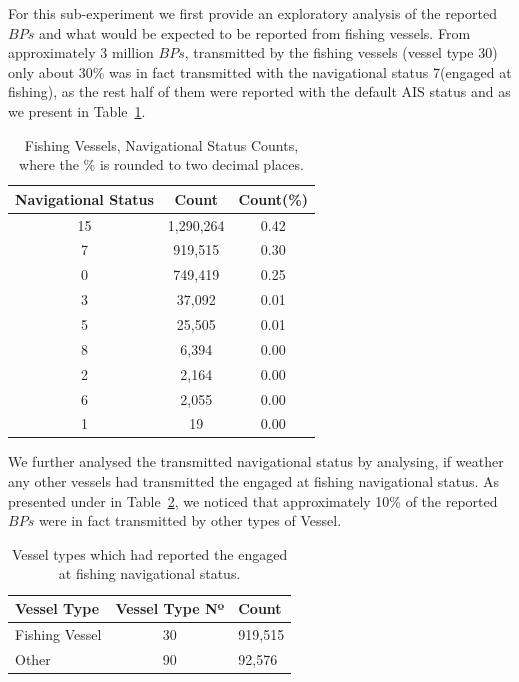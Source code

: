 For this sub-experiment we first provide an exploratory analysis of the reported $BPs$ and what would be expected to be reported from fishing vessels. From approximately 3 million $BPs$, transmitted by the fishing vessels (vessel type 30) only about 30\% was in fact transmitted with the navigational status 7(engaged at fishing), as the rest half of them were reported with the default AIS status and as we present in Table~\ref{Table : 5 Fishing Status Counts}. 

\begin{table}[H]
\centering
\caption{Fishing Vessels, Navigational Status Counts, where the \% is rounded to two decimal places.}
\label{Table : 5 Fishing Status Counts}
\begin{tabular}{@{}ccc@{}}
\toprule
Navigational Status & Count & Count(\%) \\ \midrule
15 & 1,290,264 & 0.42 \\
7 & 919,515 & 0.30 \\
0 & 749,419 & 0.25 \\
3 & 37,092 & 0.01 \\
5 & 25,505 & 0.01 \\
8 & 6,394 & 0.00 \\
2 & 2,164 & 0.00 \\
6 & 2,055 & 0.00 \\
1 & 19 & 0.00 \\ \bottomrule
\end{tabular}
\end{table}

We further analysed the transmitted navigational status by analysing, if weather any other vessels had transmitted the engaged at fishing navigational status. As presented under in Table~\ref{Table : 5 Fishing Vessel Type}, we noticed that approximately 10\% of the reported $BPs$ were in fact transmitted by other types of Vessel.

\begin{table}[H]
\centering
\caption{Vessel types which had reported the engaged at fishing navigational status.}
\label{Table : 5 Fishing Vessel Type}
\begin{tabular}{@{}lcl@{}}
\toprule
Vessel Type & Vessel Type Nº & Count \\ \midrule
Fishing Vessel & 30 & 919,515 \\
Other & 90 & 92,576 \\ \bottomrule
\end{tabular}
\end{table}

